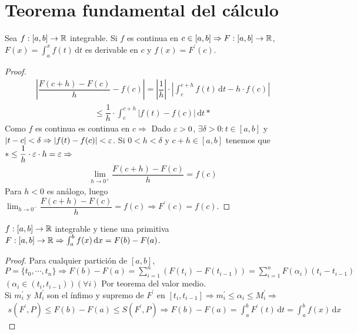\section{Teorema fundamental del cálculo}

\begin{theorem}
  Sea $f: [a, b] \to \mathbb{R}$ integrable. Si $f$ es continua en $c \in [a, b] \Rightarrow F: [a, b] \to \mathbb{R}$, $F(x) = \int_a^x f(t)\, \mathrm{d}t$ es derivable en $c$ y $f(x) = F^{\prime}(c)$.
  \begin{proof}
    \begin{align*}
      | \dfrac{F(c+h) - F(c)}{h} - f(c) | = |\dfrac{1}{h}| \cdot | \int_c^{c+h} f(t)\, \mathrm{d}t - h \cdot f(c) |
    \end{align*}
    \begin{align*}
      \leq \dfrac{1}{h} \cdot \int_c^{c+h}| f(t) - f(c) | \, \mathrm{d}t *
    \end{align*}
    Como $f$ es continua es continua en $c \Rightarrow$ Dado $\varepsilon > 0$, $\exists \delta > 0 : t \in [a, b]$ y $|t-c| < \delta \Rightarrow |f(t) - f(c)| < \varepsilon$.
    Si $0 < h < \delta$ y $c+h \in [a, b]$ tenemos que $* \leq \dfrac{1}{h} \cdot \varepsilon \cdot h = \varepsilon \Rightarrow$ \begin{align*}
      \lim_{h \to 0^+} \dfrac{F(c+h) - F(c)}{h} = f(c)
    \end{align*}
    Para $h < 0$ es análogo, luego $\lim_{h \to 0^-} \dfrac{F(c+h) - F(c)}{h} = f(c) \Rightarrow F^{\prime}(c) = f(c)$.
  \end{proof}
\end{theorem}

\begin{corollary}
  $f: [a, b] \to \mathbb{R}$ integrable y tiene una primitiva $F: [a, b] \to \mathbb{R} \Rightarrow \int_a^b f(x) \, \mathrm{d}x = F(b) - F(a)$.
  \begin{proof}
    Para cualquier partición de $[a, b]$, $P = \{ t_0, \cdots, t_n \} \Rightarrow F(b) - F(a) = \sum_{i = 1}^n (F(t_i) - F(t_{i-1})) = \sum_{i = 1}^n F(\alpha_i) (t_i - t_{i-1})$ $(\alpha_i \in (t_i, t_{i-1}))(\forall i)$ Por teorema del valor medio. \\
    Si $m_i^{\prime}$ y $M_i^{\prime}$ son el ínfimo y supremo de $F^{\prime}$ en $[t_i, t_{i-1}] \Rightarrow m_i^{\prime} \leq \alpha_i \leq M_i^{\prime} \Rightarrow$\
    \begin{align*}
      s(F^{\prime}, P) \leq F(b) - F(a) \leq S(F^{\prime}, P) \Rightarrow F(b) - F(a) = \int_a^b F^{\prime}(t) \, \mathrm{d}t = \int_a^b f(x) \, \mathrm{d}x
    \end{align*}
  \end{proof}
\end{corollary}

